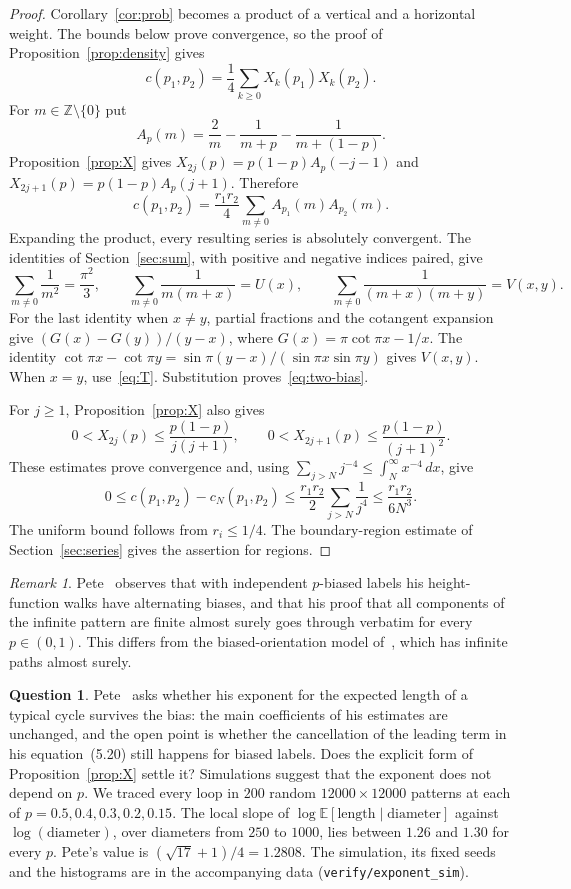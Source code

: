 \documentclass[11pt]{amsart}
\theoremstyle{definition}
\newtheorem{question}[theorem]{Question}
\theoremstyle{remark}
\newtheorem{remark}[theorem]{Remark}
\newcommand{\E}{\mathbb{E}}
\begin{document}
\begin{proof}
Corollary~\ref{cor:prob} becomes a product of a vertical and a horizontal weight. The bounds
below prove convergence, so the proof of Proposition~\ref{prop:density} gives
\[
c(p_1,p_2)=\frac14\sum_{k\ge0}X_k(p_1)X_k(p_2).
\]
For $m\in\mathbb Z\setminus\{0\}$ put
\[
A_p(m)=\frac2m-\frac1{m+p}-\frac1{m+(1-p)}.
\]
Proposition~\ref{prop:X} gives $X_{2j}(p)=p(1-p)A_p(-j-1)$ and
$X_{2j+1}(p)=p(1-p)A_p(j+1)$. Therefore
\[
c(p_1,p_2)=\frac{r_1r_2}{4}\sum_{m\ne0}A_{p_1}(m)A_{p_2}(m).
\]
Expanding the product, every resulting series is absolutely convergent. The identities of
Section~\ref{sec:sum}, with positive and negative indices paired, give
\[
\sum_{m\ne0}\frac1{m^2}=\frac{\pi^2}{3},\qquad
\sum_{m\ne0}\frac1{m(m+x)}=U(x),\qquad
\sum_{m\ne0}\frac1{(m+x)(m+y)}=V(x,y).
\]
For the last identity when $x\ne y$, partial fractions and the cotangent expansion give
$(G(x)-G(y))/(y-x)$, where $G(x)=\pi\cot\pi x-1/x$.
The identity $\cot\pi x-\cot\pi y=\sin\pi(y-x)/(\sin\pi x\sin\pi y)$ gives $V(x,y)$.
When $x=y$, use~\eqref{eq:T}. Substitution proves~\eqref{eq:two-bias}.

For $j\ge1$, Proposition~\ref{prop:X} also gives
\[
0<X_{2j}(p)\le\frac{p(1-p)}{j(j+1)},\qquad
0<X_{2j+1}(p)\le\frac{p(1-p)}{(j+1)^2}.
\]
These estimates prove convergence and, using $\sum_{j>N}j^{-4}\le\int_N^\infty x^{-4}\,dx$,
give
\[
0\le c(p_1,p_2)-c_N(p_1,p_2)
\le\frac{r_1r_2}{2}\sum_{j>N}\frac1{j^4}
\le\frac{r_1r_2}{6N^3}.
\]
The uniform bound follows from $r_i\le1/4$. The boundary-region estimate of
Section~\ref{sec:series} gives the assertion for regions.
\end{proof}

\begin{remark}
Pete~\cite[Section~7, ``Biased coins'']{Pet08} observes that with independent $p$-biased labels his
height-function walks have alternating biases, and that his proof that all components of the infinite
pattern are finite almost surely goes through verbatim for every $p\in(0,1)$. This
differs from the biased-orientation model of~\cite{MMS25}, which has infinite paths almost surely.
\end{remark}

\begin{question}
Pete~\cite[Section~7]{Pet08} asks whether his exponent for the expected length of a typical cycle
survives the bias: the main coefficients of his estimates are unchanged, and the open point is
whether the cancellation of the leading term in his equation~(5.20) still happens for biased labels. Does the explicit form of Proposition~\ref{prop:X} settle it?
Simulations suggest that the exponent does not depend on $p$. We traced every loop in $200$ random
$12000\times12000$ patterns at each of $p=0.5,0.4,0.3,0.2,0.15$. The local slope of
$\log\E[\text{length}\mid\text{diameter}]$ against $\log(\text{diameter})$, over diameters from
$250$ to $1000$, lies between $1.26$ and $1.30$ for every $p$. Pete's value is
$(\sqrt{17}+1)/4=1.2808$. The simulation, its fixed seeds and the histograms are in the
accompanying data (\texttt{verify/exponent\_sim}).
\end{question}
\end{document}
